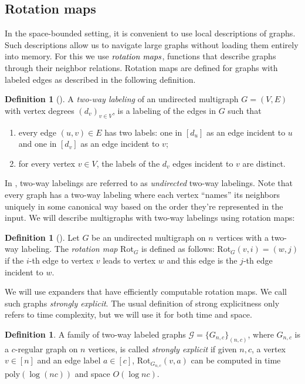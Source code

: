 \documentclass[11pt]{article}
\numberwithin{equation}{section}
\theoremstyle{definition}
\newtheorem{definition}[theorem]{Definition}
\theoremstyle{plain}
\numberwithin{myalgctr}{section}
\theoremstyle{named}
\begin{document}
\subsection{Rotation maps}
In the space-bounded setting, it is convenient to use local descriptions of graphs. Such descriptions allow us to navigate large graphs without loading them entirely into memory. For this we use $\emph{rotation maps}$, functions that describe graphs through their neighbor relations. Rotation maps are defined for graphs with labeled edges as described in the following definition.

\begin{definition}[\cite{ReingoldVaWi01}]
\label{def:labeling}
A \emph{two-way labeling} of an undirected multigraph $G=(V,E)$ with vertex degrees $(d_v)_{v\in V}$, is a labeling of the edges in $G$ such that 
\begin{enumerate}
\item every edge $(u,v)\in E$ has two labels: one in $[d_u]$ as an edge incident to $u$ and one in $[d_v]$ as an edge incident to $v$;
\item for every vertex $v\in V$, the labels of the $d_v$ edges incident to $v$ are distinct.
\end{enumerate}
\end{definition}
In \cite{RozenmanVa05}, two-way labelings are referred to as \emph{undirected} two-way labelings. Note that every graph has a two-way labeling where each vertex ``names'' its neighbors uniquely in some canonical way based on the order they're represented in the input. We will describe multigraphs with two-way labelings using rotation maps:

\begin{definition}[\cite{ReingoldVaWi01}]
\label{def:rotmap}
Let $G$ be an undirected multigraph on $n$ vertices with a two-way labeling. The \emph{rotation map} Rot$_{G}$ is defined as follows: Rot$_{G}(v,i)=(w,j)$ if the $i$-th edge to vertex $v$ leads to vertex $w$ and this edge is the $j$-th edge incident to $w$. 
\end{definition}

We will use expanders that have efficiently computable rotation maps. We call such graphs \emph{strongly explicit}. The usual definition of strong explicitness only refers to time complexity, but we will use it for both time and space. 
\begin{definition}
A family of two-way labeled graphs $\mathcal{G}=\{G_{n,c}\}_{(n,c)}$, where $G_{n,c}$ is a $c$-regular graph on $n$ vertices, is called \emph{strongly explicit} if given $n,c$, a vertex $v\in[n]$ and an edge label $a\in[c]$, Rot$_{G_{n,c}}(v,a)$ can be computed in time $\mathrm{poly}(\log (nc))$ and space $O(\log nc)$.
\end{definition}
\end{document}
